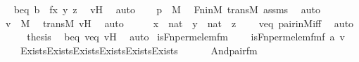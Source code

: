 \begin{isabellebody}
\ \isamarkupfalse%
\ beq{\isacharcolon}{\kern0pt}\ {\isachardoublequoteopen}b\ {\isacharequal}{\kern0pt}\ {\isacharless}{\kern0pt}{\isacharless}{\kern0pt}f{\isacharbackquote}{\kern0pt}x{\isacharcomma}{\kern0pt}\ y{\isachargreater}{\kern0pt}{\isacharcomma}{\kern0pt}\ z{\isachargreater}{\kern0pt}{\isachardoublequoteclose}\ \isamarkupfalse%
\ vH\ \isamarkupfalse%
\ auto\isanewline
\ \ \isamarkupfalse%
\ {\isachardoublequoteopen}p\ {\isasymin}\ M{\isachardoublequoteclose}\ \isamarkupfalse%
\ Fn{\isacharunderscore}{\kern0pt}in{\isacharunderscore}{\kern0pt}M\ transM\ assms\ \isamarkupfalse%
\ auto\isanewline
\ \ \isamarkupfalse%
\ \isamarkupfalse%
\ {\isachardoublequoteopen}v\ {\isasymin}\ M{\isachardoublequoteclose}\ \isamarkupfalse%
\ transM\ vH\ \isamarkupfalse%
\ auto\isanewline
\ \ \isamarkupfalse%
\ \isamarkupfalse%
\ {\isachardoublequoteopen}x\ {\isasymin}\ nat\ {\isasymand}\ y\ {\isasymin}\ nat\ {\isasymand}\ z\ {\isasymin}\ {}{\isachardoublequoteclose}\ \isamarkupfalse%
\ veq\ pair{\isacharunderscore}{\kern0pt}in{\isacharunderscore}{\kern0pt}M{\isacharunderscore}{\kern0pt}iff\ \isamarkupfalse%
\ auto\isanewline
\ \ \isamarkupfalse%
\ \isamarkupfalse%
\ {\isacharquery}{\kern0pt}thesis\ \isamarkupfalse%
\ beq\ veq\ vH\ \isamarkupfalse%
\ auto\isanewline
{}\isamarkupfalse%
%
\endisatagproof
{\isafoldproof}%
%
\isadelimproof
\isanewline
%
\endisadelimproof
\isanewline
\isanewline
{}\isamarkupfalse%
\ is{\isacharunderscore}{\kern0pt}Fn{\isacharunderscore}{\kern0pt}perm{\isacharunderscore}{\kern0pt}elem{\isacharunderscore}{\kern0pt}fm\ \ \isanewline
\ \ {\isachardoublequoteopen}is{\isacharunderscore}{\kern0pt}Fn{\isacharunderscore}{\kern0pt}perm{\isacharunderscore}{\kern0pt}elem{\isacharunderscore}{\kern0pt}fm{\isacharparenleft}{\kern0pt}f{\isacharcomma}{\kern0pt}\ a{\isacharcomma}{\kern0pt}\ v{\isacharparenright}{\kern0pt}\ {\isasymequiv}\ \isanewline
\ \ \ \ Exists{\isacharparenleft}{\kern0pt}Exists{\isacharparenleft}{\kern0pt}Exists{\isacharparenleft}{\kern0pt}Exists{\isacharparenleft}{\kern0pt}Exists{\isacharparenleft}{\kern0pt}Exists{\isacharparenleft}{\kern0pt}\isanewline
\ \ \ \ \ \ And{\isacharparenleft}{\kern0pt}pair{\isacharunderscore}{\kern0pt}fm{\isacharparenleft}{\kern0pt}{}{\isacharcomma}{\kern0pt}\ {}{\isacharcomma}{\kern0pt}\ {}{\isacharparenright}{\kern0pt}{\isacharcomma}{\kern0pt}\ \isanewline

\end{isabellebody}
